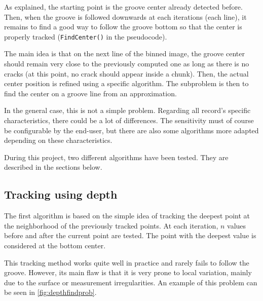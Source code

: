 As explained, the starting point is the groove center already detected before. Then, when the groove is followed downwards at each iterations (each line), it remains to find a good way to follow the groove bottom so that the center is properly tracked (\texttt{FindCenter()} in the pseudocode).

The main idea is that on the next line of the binned image, the groove center should remain very close to the previously computed one as long as there is no cracks (at this point, no crack should appear inside a chunk). Then, the actual center position is refined using a specific algorithm. The subproblem is then to find the center on a groove line from an approximation.

In the general case, this is not a simple problem. Regarding all record's specific characteristics, there could be a lot of differences. The sensitivity must of course be configurable by the end-user, but there are also some algorithms more adapted depending on these characteristics.

During this project, two different algorithms have been tested. They are described in the sections below.

\subsection{Tracking using depth}

The first algorithm is based on the simple idea of tracking the deepest point at the neighborhood of the previously tracked points. At each iteration, $n$ values before and after the current point are tested. The point with the deepest value is considered at the bottom center.

This tracking method works quite well in practice and rarely fails to follow the groove. However, its main flaw is that it is very prone to local variation, mainly due to the surface or measurement irregularities. An example of this problem can be seen in \autoref{fig:depthfindprob}.

